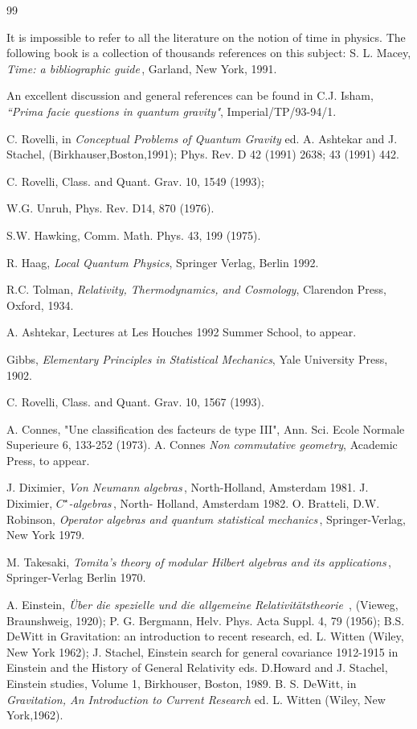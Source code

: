\begin{thebibliography}{99}

 It is impossible to refer to all the literature
on the notion of time in physics.  The following book is a
collection of thousands references on this subject:    S. L. Macey,
{\it Time: a bibliographic guide\,}, Garland, New York, 1991.

An excellent discussion and general references can be found in
C.J. Isham, {\em ``Prima facie questions in quantum gravity"},
Imperial/TP/93-94/1.

C. Rovelli, in {\it Conceptual Problems of Quantum Gravity} ed.
A. Ashtekar and J. Stachel, (Birkhauser,Boston,1991); Phys. Rev. D
42 (1991) 2638; 43 (1991) 442.

 C. Rovelli, Class. and Quant. Grav. 10, 1549
(1993);

 W.G. Unruh, Phys. Rev. D14, 870 (1976).

 S.W. Hawking, Comm. Math. Phys. 43, 199
(1975).

 R. Haag, {\it Local Quantum Physics}, Springer
Verlag, Berlin 1992.

R.C. Tolman, {\it Relativity, Thermodynamics, and Cosmology},
Clarendon Press, Oxford, 1934.

 A. Ashtekar, Lectures at Les Houches 1992
Summer School, to appear.

Gibbs, {\it Elementary Principles in Statistical Mechanics}, Yale
University Press, 1902.

 C. Rovelli, Class. and Quant. Grav. 10, 1567
(1993).

 A. Connes, "Une classification des facteurs de type III",
Ann. Sci. Ecole Normale Superieure 6, 133-252 (1973).  A. Connes
{\it Non commutative geometry}, Academic Press, to appear.

J. Diximier, {\it Von Neumann algebras\,}, North-Holland,
Amsterdam 1981.  J. Diximier, {\it $C^\star$-algebras\,}, North-
Holland, Amsterdam 1982.  O. Bratteli, D.W. Robinson, {\it
Operator algebras and quantum statistical mechanics\,},
Springer-Verlag, New York 1979.

M. Takesaki, {\it Tomita's theory of modular Hilbert algebras and
its applications\,}, Springer-Verlag Berlin 1970.

A. Einstein, {\it \"Uber die spezielle und die allgemeine
Relativit\"atstheorie\ },  (Vieweg, Braunshweig, 1920); P. G.
Bergmann, Helv. Phys. Acta Suppl. 4, 79 (1956);  B.S. DeWitt in
Gravitation: an introduction to recent research,   ed. L. Witten
(Wiley, New York 1962);  J. Stachel, Einstein search for general
covariance 1912-1915 in Einstein and the History of General
Relativity eds. D.Howard and J. Stachel, Einstein studies, Volume
1, Birkhouser, Boston, 1989.  B. S. DeWitt,  in {\it Gravitation, An
Introduction to  Current Research} ed. L. Witten (Wiley, New
York,1962).


\end{thebibliography}
